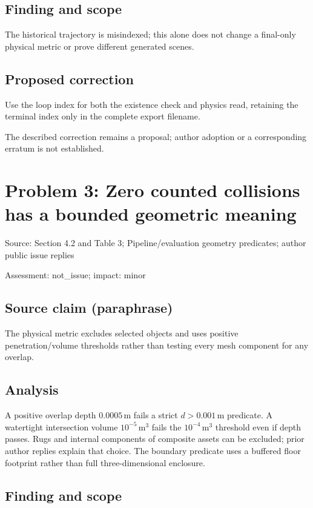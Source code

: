 \documentclass[11pt]{article}
\begin{document}
\subsection*{Finding and scope}

The historical trajectory is misindexed; this alone does not change a final-only physical metric or prove different generated scenes.

\subsection*{Proposed correction}

Use the loop index for both the existence check and physics read, retaining the terminal index only in the complete export filename.

The described correction remains a proposal; author adoption or a corresponding erratum is not established.

\section*{Problem 3: Zero counted collisions has a bounded geometric meaning}

Source: Section 4.2 and Table 3; Pipeline/evaluation geometry predicates; author public issue replies

Assessment: not\_issue; impact: minor

\subsection*{Source claim (paraphrase)}

The physical metric excludes selected objects and uses positive penetration/volume thresholds rather than testing every mesh component for any overlap.

\subsection*{Analysis}

A positive overlap depth \(0.0005\,\mathrm m\) fails a strict \(d>0.001\,\mathrm m\) predicate. A watertight intersection volume \(10^{-5}\,\mathrm m^3\) fails the \(10^{-4}\,\mathrm m^3\) threshold even if depth passes. Rugs and internal components of composite assets can be excluded; prior author replies explain that choice. The boundary predicate uses a buffered floor footprint rather than full three-dimensional enclosure.

\subsection*{Finding and scope}
\end{document}
